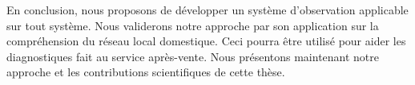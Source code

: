 En conclusion, nous proposons de développer un système d'observation applicable sur tout système. Nous validerons notre approche par son application sur la compréhension du réseau local domestique. Ceci pourra être utilisé pour aider les diagnostiques fait au service après-vente. Nous présentons maintenant notre approche et les contributions scientifiques de cette thèse.